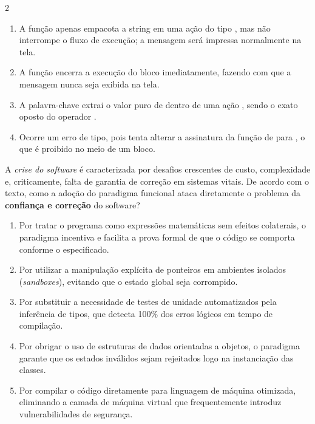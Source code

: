 \documentclass[a4paper,10pt,brazil]{article}
\begin{document}
\begin{multicols}{2}
\begin{enumerate}
  \item A função  apenas empacota a string em uma ação do tipo , mas não interrompe o fluxo de execução; a mensagem  será impressa normalmente na tela.

  \item A função  encerra a execução do bloco  imediatamente, fazendo com que a mensagem  nunca seja exibida na tela.

  \item A palavra-chave  extrai o valor puro de dentro de uma ação , sendo o exato oposto do operador \haskellinline{<-}.

  \item Ocorre um erro de tipo, pois  tenta alterar a assinatura da função de  para , o que é proibido no meio de um bloco.


\end{enumerate}

A \emph{crise do software} é caracterizada por desafios crescentes de custo, complexidade e, criticamente, falta de garantia de correção em sistemas vitais. De acordo com o texto, como a adoção do paradigma funcional ataca diretamente o problema da \textbf{confiança e correção} do software?

\begin{enumerate}
  \item Por tratar o programa como expressões matemáticas sem efeitos colaterais, o paradigma incentiva e facilita a prova formal de que o código se comporta conforme o especificado.

  \item Por utilizar a manipulação explícita de ponteiros em ambientes isolados (\emph{sandboxes}), evitando que o estado global seja corrompido.

  \item Por substituir a necessidade de testes de unidade automatizados pela inferência de tipos, que detecta 100\% dos erros lógicos em tempo de compilação.

  \item Por obrigar o uso de estruturas de dados orientadas a objetos, o paradigma garante que os estados inválidos sejam rejeitados logo na instanciação das classes.

  \item Por compilar o código diretamente para linguagem de máquina otimizada, eliminando a camada de máquina virtual que frequentemente introduz vulnerabilidades de segurança.



\end{enumerate}
\end{multicols}
\end{document}
